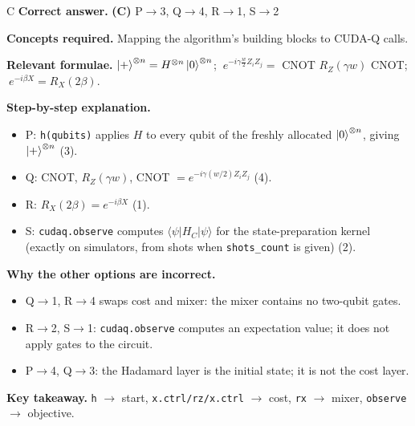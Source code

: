 \documentclass[11pt,a4paper]{article}
\newcommand{\qsep}{\par\vspace{2pt}{\color{black!15}\hrule}\vspace{4pt}}
\begin{document}
\begin{solbox}{C}
\textbf{\color{brand}Correct answer.} \textcolor{okgreen}{\textbf{(C)}} P$\to$3, Q$\to$4, R$\to$1, S$\to$2

\textbf{\color{brand}Concepts required.} Mapping the algorithm's building blocks to CUDA-Q calls.

\textbf{\color{brand}Relevant formulae.} $\ket+^{\otimes n} = H^{\otimes n}\ket0^{\otimes n}$; $\ e^{-i\gamma\frac w2Z_iZ_j} = $ CNOT $R_Z(\gamma w)$ CNOT; $\ e^{-i\beta X} = R_X(2\beta)$.

\textbf{\color{brand}Step-by-step explanation.} \begin{itemize}\itemsep0pt
\item P: \texttt{h(qubits)} applies $H$ to every qubit of the freshly allocated $\ket0^{\otimes n}$, giving $\ket+^{\otimes n}$ (3).
\item Q: CNOT, $R_Z(\gamma w)$, CNOT $= e^{-i\gamma(w/2)Z_iZ_j}$ (4).
\item R: $R_X(2\beta) = e^{-i\beta X}$ (1).
\item S: \texttt{cudaq.observe} computes $\langle\psi|H_C|\psi\rangle$ for the state-preparation kernel (exactly on simulators, from shots
when \texttt{shots\_count} is given) (2).
\end{itemize}

\textbf{\color{brand}Why the other options are incorrect.}
\begin{itemize}[leftmargin=2.4em, itemsep=1pt, topsep=2pt]
\item[\textbf{(A)}] Q$\to$1, R$\to$4 swaps cost and mixer: the mixer contains no two-qubit gates.
\item[\textbf{(B)}] R$\to$2, S$\to$1: \texttt{cudaq.observe} computes an expectation value; it does not apply gates to the circuit.
\item[\textbf{(D)}] P$\to$4, Q$\to$3: the Hadamard layer is the initial state; it is not the cost layer.
\end{itemize}
\textbf{\color{brand}Key takeaway.} \texttt{h} $\to$ start, \texttt{x.ctrl/rz/x.ctrl} $\to$ cost, \texttt{rx} $\to$ mixer, \texttt{observe} $\to$ objective.
\end{solbox}
\qsep
\end{document}
